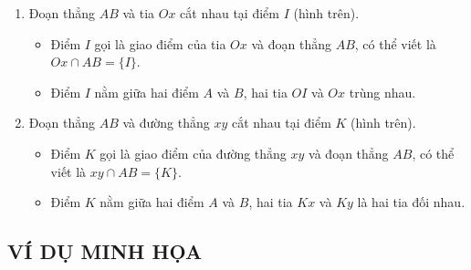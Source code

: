 \begin{enumerate}
\begin{center}
	\end{center}
	\item Đoạn thẳng $AB$ và tia $Ox$ cắt nhau tại điểm $I$ (hình trên).
	\begin{itemize}
		\item Điểm $I$ gọi là giao điểm của tia $Ox$ và đoạn thẳng $AB$, có thể viết là $Ox\cap AB=\{I\}$.
		\item Điểm $I$ nằm giữa hai điểm $A$ và $B$, hai tia $OI$ và $Ox$ trùng nhau.
	\end{itemize}
	\item Đoạn thẳng $AB$ và đường thẳng $xy$ cắt nhau tại điểm $K$ (hình trên).
	\begin{itemize}
		\item Điểm $K$ gọi là giao điểm của đường thẳng $xy$ và đoạn thẳng $AB$, có thể viết là $xy\cap AB=\{K\}$.
		\item Điểm $K$ nằm giữa hai điểm $A$ và $B$, hai tia $Kx$ và $Ky$ là hai tia đối nhau.
	\end{itemize}
\end{enumerate}
\subsection{VÍ DỤ MINH HỌA}

